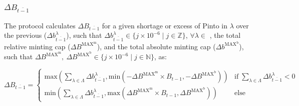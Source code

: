 \documentclass[class=article, crop=false]{standalone}
\begin{document}

\subsubsection{$\Delta B_{\overline{t-1}}$}

The protocol calculates $\Delta B_{\overline{t-1}}$ for a given shortage or excess of Pinto in $\lambda$ over the previous  ($\Delta b_{\overline{t-1}}^{\lambda}$), such that $\Delta b_{\overline{t-1}}^{\lambda} \in \{j \times 10^{-6} \mid j \in \mathbb{Z} \}$, $\forall \lambda \in$ , the total relative minting cap ($\Delta B^{\text{MAX}^{\text{m}}}$), and the total absolute minting cap ($\Delta b^{\text{MAX}^{\text{b}}}$), such that $\Delta B^{\text{MAX}^{\text{m}}},\ \Delta B^{\text{MAX}^{\text{b}}} \in \{j \times 10^{-6} \mid j \in \mathbb{N} \}$, as:

    $$
        \Delta B_{\overline{t-1}} = 
            \begin{cases} 
                \text{max}\left(
                         \sum\limits_{\lambda \in \Lambda} \Delta b_{\overline{t-1}}^{\lambda}, 
                        \text{min}(-\Delta B^{\text{MAX}^{\text{m}}} \times B_{t-1},
                        -\Delta B^{\text{MAX}^{\text{b}}}) \right)
                    & \text{if} \; \sum\limits_{\lambda \in \Lambda} \Delta b_{\overline{t-1}}^{\lambda} < 0 \\ 
                
                \text{min}\left(
                         \sum\limits_{\lambda \in \Lambda} \Delta b_{\overline{t-1}}^{\lambda}, 
                        \text{max}(\Delta B^{\text{MAX}^{\text{m}}} \times B_{t-1},
                        \Delta B^{\text{MAX}^{\text{b}}}) \right)
                    & \text{else} 
            \end{cases}
    $$
\end{document}
